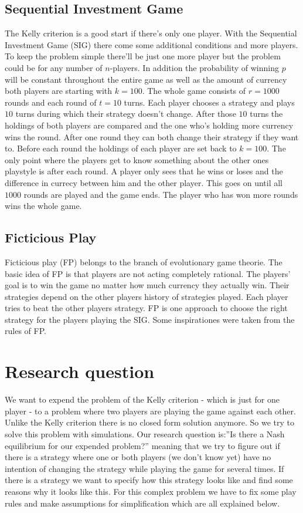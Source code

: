 \documentclass[11pt]{article}
\begin{document}
\subsection{Sequential Investment Game}
The Kelly criterion is a good start if there's only one player. With the Sequential Investment Game (SIG) there come some additional conditions and more players. To keep the problem simple there'll be just one more player but the problem could be for any number of $n$-players. In addition the probability of winning $p$ will be constant throughout the entire game as well as the amount of currency both players are starting with $k=100$. The whole game consists of $r=1000$ rounds and each round of $t=10$ turns. Each player chooses a strategy and plays $10$ turns during which their strategy doesn't change. After those $10$ turns the holdings of both players are compared and the one who's holding more currency wins the round. After one round they can both change their strategy if they want to. Before each round the holdings of each player are set back to $k=100$. The only point where the players get to know something about the other ones playstyle is after each round. A player only sees that he wins or loses and the difference in currecy between him and the other player. This goes on until all $1000$ rounds are played and the game ends. The player who has won more rounds wins the whole game.

\subsection{Ficticious Play}
Ficticious play (FP) belongs to the branch of evolutionary game theorie. The basic idea of FP is that players are not acting completely rational. The players' goal is to win the game no matter how much currency they actually win. Their strategies depend on the other players history of strategies played. Each player tries to beat the other players strategy. FP is one approach to choose the right strategy for the players playing the SIG. Some inspirationes were taken from the rules of FP.
\pagebreak
\section{Research question}
We want to expend the problem of the Kelly criterion - which is just for one player - to a problem where two players are playing the game against each other. Unlike the Kelly criterion there is no closed form solution anymore. So we try to solve this problem with simulations. Our research question is:''Is there a Nash equilibrium for our expended problem?'' meaning that we try to figure out if there is a strategy where one or both players (we don't know yet) have no intention of changing the strategy while playing the game for several times. If there is a strategy we want to specify how this strategy looks like and find some reasons why it looks like this. For this complex problem we have to fix some play rules and make  assumptions for simplification which are all explained below.
\end{document}
